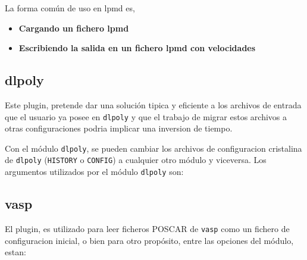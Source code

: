 La forma com\'un de uso en lpmd es,

\begin{itemize}
 \item \textbf{Cargando un fichero lpmd}
 \item \textbf{Escribiendo la salida en un fichero lpmd con velocidades}
\end{itemize}

\subsection{dlpoly}
Este plugin, pretende dar una soluci\'on tipica y eficiente a los archivos de entrada que el usuario ya posee en \verb|dlpoly| y que el trabajo de migrar estos archivos a otras configuraciones podria implicar una inversion de tiempo.

Con el m\'odulo \verb|dlpoly|, se pueden cambiar los archivos de configuracion cristalina de \verb|dlpoly| (\verb|HISTORY| o \verb|CONFIG|) a cualquier otro m\'odulo y viceversa. Los argumentos utilizados por el m\'odulo \verb|dlpoly| son:


\subsection{vasp}
El plugin, es utilizado para leer ficheros POSCAR de \verb|vasp| como un fichero de configuracion inicial, o bien para otro prop\'osito, entre las opciones del m\'odulo, estan:


